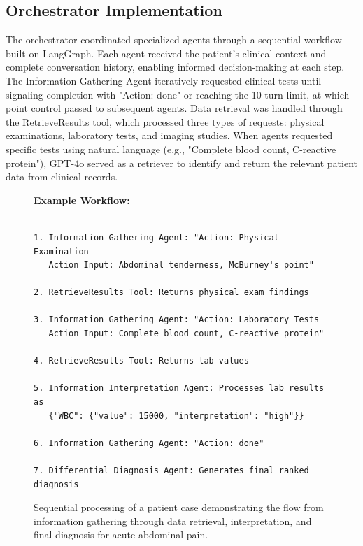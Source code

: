 \documentclass[manuscript, nonacm]{acmart}
\begin{document}
\subsection{Orchestrator Implementation}
\label{sec:orchest}

The orchestrator coordinated specialized agents through a sequential workflow built on LangGraph. Each agent received the patient's clinical context and complete conversation history, enabling informed decision-making at each step. The Information Gathering Agent iteratively requested clinical tests until signaling completion with "Action: done" or reaching the 10-turn limit, at which point control passed to subsequent agents.
Data retrieval was handled through the RetrieveResults tool, which processed three types of requests: physical examinations, laboratory tests, and imaging studies. When agents requested specific tests using natural language (e.g., "Complete blood count, C-reactive protein"), GPT-4o served as a retriever to identify and return the relevant patient data from clinical records.

\begin{figure}[H]            %
\centering
\begin{tcolorbox}[
    colback = lightgray,
    colframe = darkgray,
    width   = \columnwidth,
    boxrule = 0.4pt,
    arc     = 3pt,
    left=6pt,right=6pt,top=6pt,bottom=6pt]
\textbf{Example Workflow:}
\begin{Verbatim}[fontsize=\scriptsize]

1. Information Gathering Agent: "Action: Physical Examination
   Action Input: Abdominal tenderness, McBurney's point"
   
2. RetrieveResults Tool: Returns physical exam findings
   
3. Information Gathering Agent: "Action: Laboratory Tests  
   Action Input: Complete blood count, C-reactive protein"
   
4. RetrieveResults Tool: Returns lab values
   
5. Information Interpretation Agent: Processes lab results as 
   {"WBC": {"value": 15000, "interpretation": "high"}}
   
6. Information Gathering Agent: "Action: done"
   
7. Differential Diagnosis Agent: Generates final ranked diagnosis

\end{Verbatim}
\end{tcolorbox}
\caption{Sequential processing of a patient case demonstrating the flow from information gathering through data retrieval, interpretation, and final diagnosis for acute abdominal pain.}
\end{figure}
\end{document}
